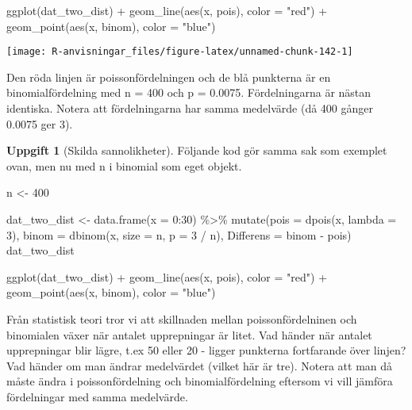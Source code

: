 \documentclass[
]{book}
\newenvironment{Shaded}{\begin{snugshade}}{\end{snugshade}}
\newcommand{\AttributeTok}[1]{\textcolor[rgb]{0.77,0.63,0.00}{#1}}
\newcommand{\DecValTok}[1]{\textcolor[rgb]{0.00,0.00,0.81}{#1}}
\newcommand{\FunctionTok}[1]{\textcolor[rgb]{0.00,0.00,0.00}{#1}}
\newcommand{\NormalTok}[1]{#1}
\newcommand{\OtherTok}[1]{\textcolor[rgb]{0.56,0.35,0.01}{#1}}
\newcommand{\SpecialCharTok}[1]{\textcolor[rgb]{0.00,0.00,0.00}{#1}}
\newcommand{\StringTok}[1]{\textcolor[rgb]{0.31,0.60,0.02}{#1}}
\theoremstyle{definition}
\theoremstyle{definition}
\theoremstyle{definition}
\newtheorem{exercise}{Uppgift}[chapter]
\theoremstyle{definition}
\theoremstyle{remark}
\begin{document}
\begin{Shaded}
\begin{Highlighting}[]
\FunctionTok{ggplot}\NormalTok{(dat\_two\_dist) }\SpecialCharTok{+}
  \FunctionTok{geom\_line}\NormalTok{(}\FunctionTok{aes}\NormalTok{(x, pois), }\AttributeTok{color =} \StringTok{"red"}\NormalTok{) }\SpecialCharTok{+}
  \FunctionTok{geom\_point}\NormalTok{(}\FunctionTok{aes}\NormalTok{(x, binom), }\AttributeTok{color =} \StringTok{"blue"}\NormalTok{)}
\end{Highlighting}
\end{Shaded}

\begin{center}\texttt{[image: R-anvisningar\_files/figure-latex/unnamed-chunk-142-1]} \end{center}

Den röda linjen är poissonfördelningen och de blå punkterna är en binomialfördelning med n = 400 och p = 0.0075. Fördelningarna är nästan identiska. Notera att fördelningarna har samma medelvärde (då 400 gånger 0.0075 ger 3).

\begin{exercise}[Skilda sannolikheter]
Följande kod gör samma sak som exemplet ovan, men nu med n i binomial som eget objekt.

\begin{Shaded}
\begin{Highlighting}[]
\NormalTok{n }\OtherTok{\textless{}{-}} \DecValTok{400}

\NormalTok{dat\_two\_dist }\OtherTok{\textless{}{-}} \FunctionTok{data.frame}\NormalTok{(}\AttributeTok{x =} \DecValTok{0}\SpecialCharTok{:}\DecValTok{30}\NormalTok{) }\SpecialCharTok{\%\textgreater{}\%} 
  \FunctionTok{mutate}\NormalTok{(}\AttributeTok{pois =} \FunctionTok{dpois}\NormalTok{(x, }\AttributeTok{lambda =} \DecValTok{3}\NormalTok{),}
         \AttributeTok{binom =} \FunctionTok{dbinom}\NormalTok{(x, }\AttributeTok{size =}\NormalTok{ n, }\AttributeTok{p =} \DecValTok{3} \SpecialCharTok{/}\NormalTok{ n),}
         \AttributeTok{Differens =}\NormalTok{ binom }\SpecialCharTok{{-}}\NormalTok{ pois)}
\NormalTok{dat\_two\_dist}

\FunctionTok{ggplot}\NormalTok{(dat\_two\_dist) }\SpecialCharTok{+}
  \FunctionTok{geom\_line}\NormalTok{(}\FunctionTok{aes}\NormalTok{(x, pois), }\AttributeTok{color =} \StringTok{"red"}\NormalTok{) }\SpecialCharTok{+}
  \FunctionTok{geom\_point}\NormalTok{(}\FunctionTok{aes}\NormalTok{(x, binom), }\AttributeTok{color =} \StringTok{"blue"}\NormalTok{)}
\end{Highlighting}
\end{Shaded}

Från statistisk teori tror vi att skillnaden mellan poissonfördelninen och binomialen växer när antalet upprepningar är litet. Vad händer när antalet upprepningar blir lägre, t.ex 50 eller 20 - ligger punkterna fortfarande över linjen? Vad händer om man ändrar medelvärdet (vilket här är tre). Notera att man då måste ändra i poissonfördelning och binomialfördelning eftersom vi vill jämföra fördelningar med samma medelvärde.
\end{exercise}
\end{document}
